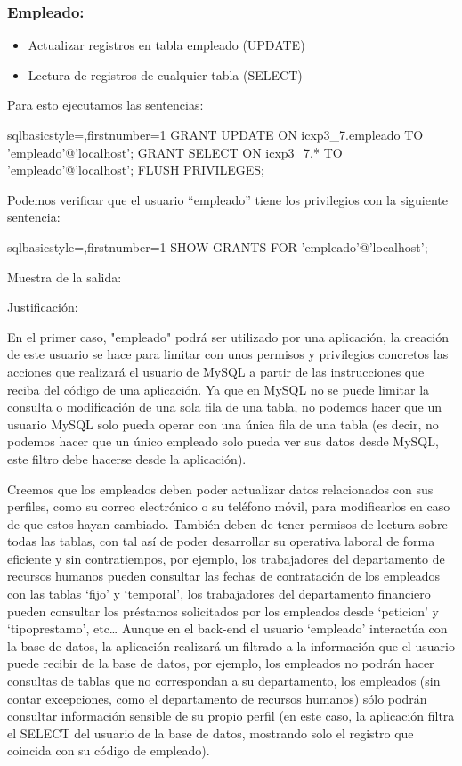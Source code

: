 	\subsubsection*{Empleado:}
		\begin{itemize}
			\item Actualizar registros en tabla empleado (UPDATE)
			\item Lectura de registros de cualquier tabla (SELECT)
		\end{itemize}
	Para esto ejecutamos las sentencias:
	\begin{sourcecodep}[]{sql}{basicstyle={\fontsize{10}{10}\selectfont\ttfamily},firstnumber=1}{}
		GRANT UPDATE ON icxp3_7.empleado TO  'empleado'@'localhost';
		GRANT SELECT ON icxp3_7.* TO  'empleado'@'localhost';
		FLUSH PRIVILEGES;\end{sourcecodep}
	\newp Podemos verificar que el usuario “empleado” tiene los privilegios con la siguiente sentencia:
	\begin{sourcecodep}[]{sql}{basicstyle={\fontsize{10}{10}\selectfont\ttfamily},firstnumber=1}{}
		SHOW GRANTS FOR 'empleado'@'localhost';\end{sourcecodep}
	\newp Muestra de la salida:
	
	Justificación:
	
	\newp En el primer caso, "empleado" podrá ser utilizado por una aplicación, la creación de este usuario se hace para limitar con unos permisos y privilegios concretos las acciones que realizará el usuario de MySQL a partir de las instrucciones que reciba del código de una aplicación. Ya que en MySQL no se puede limitar la consulta o modificación de una sola fila de una tabla, no podemos hacer que un usuario MySQL solo pueda operar con una única fila de una tabla (es decir, no podemos hacer que un único empleado solo pueda ver sus datos desde MySQL, este filtro debe hacerse desde la aplicación).
	
	\newp Creemos que los empleados deben poder actualizar datos relacionados con sus perfiles, como su correo electrónico o su teléfono móvil, para modificarlos en caso de que estos hayan cambiado. También deben de tener permisos de lectura sobre todas las tablas, con tal así de poder desarrollar su operativa laboral de forma eficiente y sin contratiempos, por ejemplo, los trabajadores del departamento de recursos humanos pueden consultar las fechas de contratación de los empleados con las tablas ‘fijo’ y ‘temporal’, los trabajadores del departamento financiero pueden consultar los préstamos solicitados por los empleados desde ‘peticion’ y ‘tipoprestamo’, etc… Aunque en el back-end el usuario ‘empleado’ interactúa con la base de datos, la aplicación realizará un filtrado a la información que el usuario puede recibir de la base de datos, por ejemplo, los empleados no podrán hacer consultas de tablas que no correspondan a su departamento, los empleados (sin contar excepciones, como el departamento de recursos humanos) sólo podrán consultar información sensible de su propio perfil (en este caso, la aplicación filtra el SELECT del usuario de la base de datos, mostrando solo el registro que coincida con su código de empleado).
	
